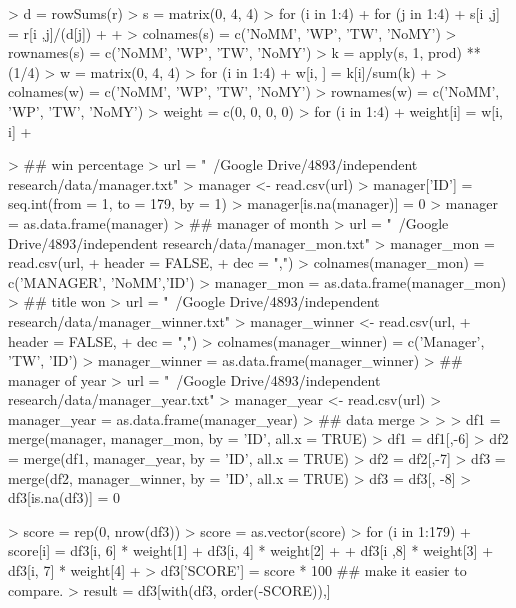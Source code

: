 \documentclass[12pt,a4paper]{article}
\begin{document}
\begin{Schunk}
\begin{Sinput}
> d = rowSums(r)
> s = matrix(0, 4, 4)
> for (i in 1:4) {
+     for (j in 1:4) {
+         s[i ,j] = r[i ,j]/(d[j])
+     }
+ }
> colnames(s) = c('NoMM', 'WP', 'TW', 'NoMY')
> rownames(s) = c('NoMM', 'WP', 'TW', 'NoMY')
> k = apply(s, 1, prod) ** (1/4)
> w = matrix(0, 4, 4)
> for (i in 1:4) {
+     w[i, ] = k[i]/sum(k)
+ }
> colnames(w) = c('NoMM', 'WP', 'TW', 'NoMY')
> rownames(w) = c('NoMM', 'WP', 'TW', 'NoMY')
> weight = c(0, 0, 0, 0)
> for (i in 1:4) {
+     weight[i] = w[i, i]
+ }
\end{Sinput}
\end{Schunk}

\begin{Schunk}
\begin{Sinput}
> ## win percentage
> url = "~/Google Drive/4893/independent research/data/manager.txt"
> manager <- read.csv(url)
> manager['ID'] = seq.int(from = 1, to = 179, by = 1)
> manager[is.na(manager)] = 0
> manager = as.data.frame(manager)
> ## manager of month
> url = "~/Google Drive/4893/independent research/data/manager_mon.txt"
> manager_mon = read.csv(url, 
+                        header = FALSE, 
+                        dec = ",")
> colnames(manager_mon) = c('MANAGER', 'NoMM','ID')
> manager_mon = as.data.frame(manager_mon)
> ## title won
> url = "~/Google Drive/4893/independent research/data/manager_winner.txt"
> manager_winner <- read.csv(url, 
+                            header = FALSE, 
+                            dec = ",")
> colnames(manager_winner) = c('Manager', 'TW', 'ID')
> manager_winner = as.data.frame(manager_winner)
> ## manager of year
> url = "~/Google Drive/4893/independent research/data/manager_year.txt"
> manager_year <- read.csv(url)
> manager_year = as.data.frame(manager_year)
> ## data merge
> 
> 
> df1 = merge(manager, manager_mon, by = 'ID', all.x = TRUE)
> df1 = df1[,-6]
> df2 = merge(df1, manager_year, by = 'ID', all.x = TRUE)
> df2 = df2[,-7]
> df3 = merge(df2, manager_winner, by = 'ID', all.x = TRUE)
> df3 = df3[, -8]
> df3[is.na(df3)] = 0
\end{Sinput}
\end{Schunk}

\begin{Schunk}
\begin{Sinput}
> score = rep(0, nrow(df3))
> score = as.vector(score)
> for (i in 1:179) {
+     score[i] = df3[i, 6] * weight[1] + df3[i, 4] * weight[2]
+     + df3[i ,8] * weight[3] + df3[i, 7] * weight[4]
+ }
> df3['SCORE'] = score * 100 ## make it easier to compare.
> result = df3[with(df3, order(-SCORE)),]
\end{Sinput}
\end{Schunk}
\end{document}
